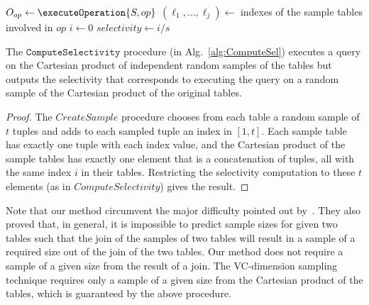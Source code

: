 \begin{algorithm}[ht]
$O_{op} \leftarrow \executeOperation{S, op}$\;
$(\ell_1,\dots,\ell_j)\leftarrow$ indexes of the sample tables involved in $op$ \;
$i\leftarrow 0$\;
$selectivity \leftarrow i/s$\;
\caption{$\mathtt{ComputeSelectivity}(\Sam,op)$}\label{alg:ComputeSel}
\end{algorithm}

\begin{theorem}\label{lem:ComputeSel}
The $\mathtt{ComputeSelectivity}$ procedure (in Alg.~\ref{alg:ComputeSel})
executes a query on the Cartesian product of independent random samples of the
tables but outputs the selectivity that corresponds to executing the query on a
random sample of the Cartesian product of the original tables. 
\end{theorem}

\begin{proof}
The $CreateSample$ procedure chooses from each table a random sample of
$t$ tuples and adds to each sampled tuple an index in $[1,t]$. Each sample table has
exactly one tuple with each index value, and the Cartesian product of the sample
tables has exactly one element that is a concatenation of tuples, all with the
same index $i$ in their tables. Restricting the selectivity computation to these
$t$ elements (as in $ComputeSelectivity$) gives the result. 
\end{proof}

Note that our method circumvent the major difficulty pointed out
by~\citet{ChaudhuriMN99}. They also proved that, in general, it
is impossible to predict sample sizes for given two tables such that the join of
the samples of two tables will result in a sample of a required size out of the
join of the two tables. Our method does not require a sample of a given size
from the result of a join. The VC-dimension sampling technique requires only a
sample of a given size from the Cartesian product of the tables, which is
guaranteed by the above procedure.

